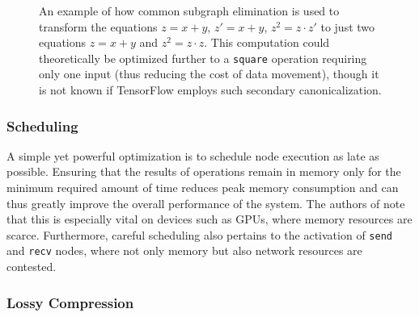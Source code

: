 \begin{figure}
\begin{subfigure}[h]{0.5\textwidth}
  \end{subfigure}
  \caption{An example of how common subgraph elimination is used to transform the
    equations $z = x + y$, $z' = x + y$, $z^2 = z \cdot z'$ to just two
    equations $z = x + y$ and $z^2 = z \cdot z$. This computation could
    theoretically be optimized further to a \texttt{square} operation requiring
    only one input (thus reducing the cost of data movement), though it is not
    known if TensorFlow employs such secondary canonicalization.}
  \label{fig:subgraph-elim}
\end{figure}

\subsubsection{Scheduling}\label{sec:model-optim-schedule}

A simple yet powerful optimization is to schedule node execution as late as
possible. Ensuring that the results of operations remain in memory only for the
minimum required amount of time reduces peak memory consumption and can thus
greatly improve the overall performance of the system. The authors of
\cite{tensorflow} note that this is especially vital on devices such as GPUs,
where memory resources are scarce. Furthermore, careful scheduling also pertains
to the activation of \texttt{send} and \texttt{recv} nodes, where not only
memory but also network resources are contested.

\subsubsection{Lossy Compression}\label{sec:model-optim-lossy}

